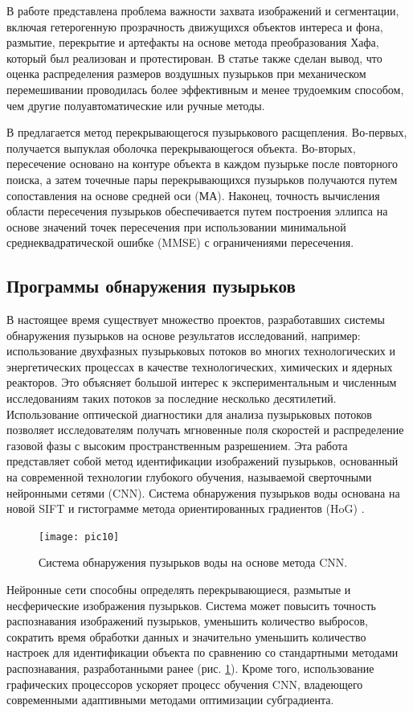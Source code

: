 \documentclass[a4paper,14pt]{extreport}
\begin{document}
В работе \cite{h11bb} представлена проблема важности захвата изображений и сегментации, включая гетерогенную прозрачность движущихся объектов интереса и фона, размытие, перекрытие и артефакты на основе метода преобразования Хафа, который был реализован и протестирован. В статье также сделан вывод, что оценка распределения размеров воздушных пузырьков при механическом перемешивании проводилась более эффективным и менее трудоемким способом, чем другие полуавтоматические или ручные методы. 

В \cite{h12bb} предлагается метод перекрывающегося пузырькового расщепления. Во-первых, получается выпуклая оболочка перекрывающегося объекта. Во-вторых, пересечение основано на контуре объекта в каждом пузырьке после повторного поиска, а затем точечные пары перекрывающихся пузырьков получаются путем сопоставления на основе средней оси (МА). Наконец, точность вычисления области пересечения пузырьков обеспечивается путем построения эллипса на основе значений точек пересечения при использовании минимальной среднеквадратической ошибке (MMSE) с ограничениями пересечения.
\subsection{Программы обнаружения пузырьков}
В настоящее время существует множество проектов, разработавших системы обнаружения пузырьков на основе результатов исследований, например: использование двухфазных пузырьковых потоков во многих технологических и энергетических процессах в качестве технологических, химических и ядерных реакторов. Это объясняет большой интерес к экспериментальным и численным исследованиям таких потоков за последние несколько десятилетий. Использование оптической диагностики для анализа пузырьковых потоков позволяет исследователям получать мгновенные поля скоростей и распределение газовой фазы с высоким пространственным разрешением. Эта работа представляет собой метод идентификации изображений пузырьков, основанный на современной технологии глубокого обучения, называемой сверточными нейронными сетями (CNN). Система обнаружения пузырьков воды \cite{h1bb} основана на новой SIFT \cite{h13bb} и гистограмме метода ориентированных градиентов (HoG) \cite{h14bb}.
\begin{figure}[ht!]
\centering
\texttt{[image: pic10]}
\caption{Система обнаружения пузырьков воды на основе метода CNN.}
	\label{pic10}
	\end{figure}

Нейронные сети способны определять перекрывающиеся, размытые и несферические изображения пузырьков. Система может повысить точность распознавания изображений пузырьков, уменьшить количество выбросов, сократить время обработки данных и значительно уменьшить количество настроек для идентификации объекта по сравнению со стандартными методами распознавания, разработанными ранее (рис. \ref{pic10}). Кроме того, использование графических процессоров ускоряет процесс обучения CNN, владеющего современными адаптивными методами оптимизации субградиента.
\end{document}
